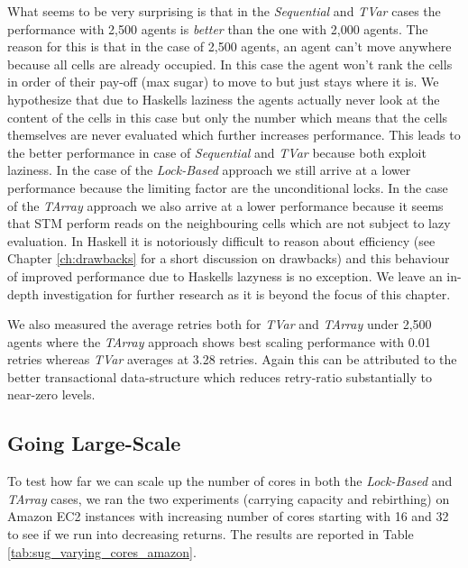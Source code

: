 What seems to be very surprising is that in the \textit{Sequential} and \textit{TVar} cases the performance with 2,500 agents is \textit{better} than the one with 2,000 agents. The reason for this is that in the case of 2,500 agents, an agent can't move anywhere because all cells are already occupied. In this case the agent won't rank the cells in order of their pay-off (max sugar) to move to but just stays where it is. We hypothesize that due to Haskells laziness the agents actually never look at the content of the cells in this case but only the number which means that the cells themselves are never evaluated which further increases performance. This leads to the better performance in case of \textit{Sequential} and \textit{TVar} because both exploit laziness.
In the case of the \textit{Lock-Based} approach we still arrive at a lower performance because the limiting factor are the unconditional locks. In the case of the \textit{TArray} approach we also arrive at a lower performance because it seems that STM perform reads on the neighbouring cells which are not subject to lazy evaluation. In Haskell it is notoriously difficult to reason about efficiency (see Chapter \ref{ch:drawbacks} for a short discussion on drawbacks) and this behaviour of improved performance due to Haskells lazyness is no exception. We leave an in-depth investigation for further research as it is beyond the focus of this chapter.

We also measured the average retries both for \textit{TVar} and \textit{TArray} under 2,500 agents where the \textit{TArray} approach shows best scaling performance with 0.01 retries whereas \textit{TVar} averages at 3.28 retries. Again this can be attributed to the better transactional data-structure which reduces retry-ratio substantially to near-zero levels.

\subsection{Going Large-Scale}
To test how far we can scale up the number of cores in both the \textit{Lock-Based} and \textit{TArray} cases, we ran the two experiments (carrying capacity and rebirthing) on Amazon EC2 instances with increasing number of cores starting with 16 and 32 to see if we run into decreasing returns. The results are reported in Table \ref{tab:sug_varying_cores_amazon}.

